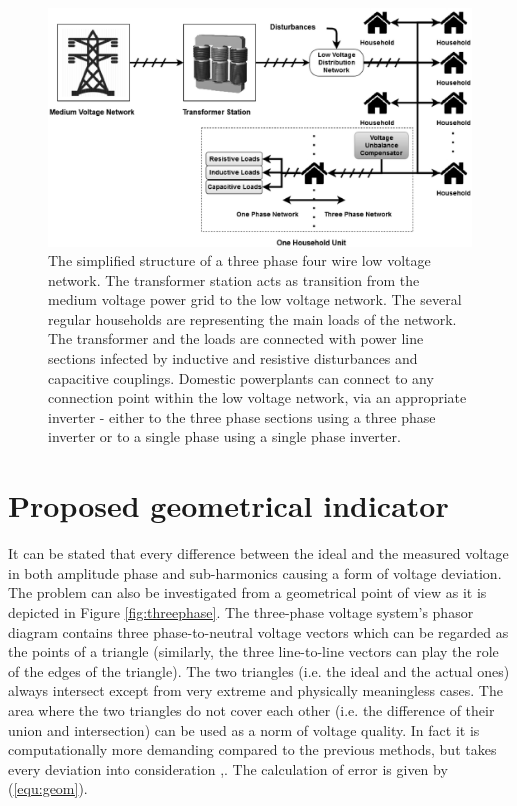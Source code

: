         \begin{figure}[!ht]
            \centering
            \includegraphics[width=\textwidth]{Unblance_EPS_Pics/network_gray.eps}
            \caption{The simplified structure of a three phase four wire low voltage network. The transformer station acts as transition from the medium voltage power grid to
            the low voltage network. The several regular households are representing the main loads of the network. The transformer and the loads are connected with power line sections infected by inductive and resistive disturbances and capacitive couplings. Domestic powerplants can connect to any connection point within the low voltage network, via an appropriate inverter - either to the three phase sections using a three phase inverter or to a single phase using a single phase inverter.}
            \label{fig:network}
            \end{figure}
        

\section{Proposed geometrical indicator}

            It can be stated that every difference between the ideal and the measured voltage in both amplitude phase and sub-harmonics causing a form of voltage deviation. The problem can also be investigated from a geometrical point of view as it is depicted in Figure \ref{fig:threephase}. The three-phase voltage system's phasor diagram contains three  phase-to-neutral voltage vectors which can be regarded as the points of a triangle (similarly, the three line-to-line vectors can play the role of the edges of the triangle). The two triangles (i.e. the ideal and the actual ones) always intersect except from very extreme and physically meaningless cases. The area where the two triangles do not cover each other (i.e. the difference of their union and intersection) can be used as a norm of voltage quality. In fact it is computationally more demanding compared to the previous methods, but takes every deviation into consideration \cite{Neukirchner2015},\cite{neukirchner2015examination}. The calculation of error is given by (\ref{equ:geom}).

